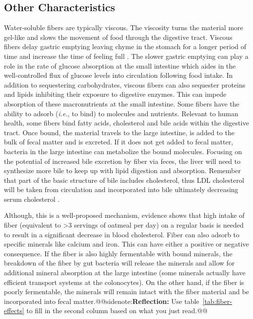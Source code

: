 \documentclass{tufte-handout}
\makeatletter
\def\sidenote#1{@@sidenote:#1@@}
\makeatother
\begin{document}
\subsection{Other Characteristics}
Water-soluble fibers are typically viscous. The viscosity turns the material more gel-like and slows the movement of food through the digestive tract. Viscous fibers delay gastric emptying leaving chyme in the stomach for a longer period of time and increase the time of feeling full \citep{Willis2009}. The slower gastric emptying can play a role in the rate of glucose absorption at the small intestine which aides in the well-controlled flux of glucose levels into circulation following food intake. In addition to sequestering carbohydrates, viscous fibers can also sequester proteins and lipids inhibiting their exposure to digestive enzymes. This can impede absorption of these macronutrients at the small intestine. Some fibers have the ability to adsorb (\textit{i.e.}, to bind) to molecules and nutrients. Relevant to human health, some fibers bind fatty acids, cholesterol and bile acids within the digestive tract. Once bound, the material travels to the large intestine, is added to the bulk of fecal matter and is excreted. If it does not get added to fecal matter, bacteria in the large intestine can metabolize the bound molecules. Focusing on the potential of increased bile excretion by fiber via feces, the liver will need to synthesize more bile to keep up with lipid digestion and absorption. Remember that part of the basic structure of bile includes cholesterol, thus LDL cholesterol will be taken from circulation and incorporated into bile ultimately decreasing serum cholesterol \citep{Brown1999}.

Although, this is a well-proposed mechanism, evidence shows that high intake of fiber (equivalent to >3 servings of oatmeal per day) on a regular basis is needed to result in a significant decrease in blood cholesterol. Fiber can also adsorb to specific minerals like calcium and iron. This can have either a positive or negative consequence. If the fiber is also highly fermentable with bound minerals, the breakdown of the fiber by gut bacteria will release the minerals and allow for additional mineral absorption at the large intestine (some minerals actually have efficient transport systems at the colonocytes). On the other hand, if the fiber is poorly fermentable, the minerals will remain intact with the fiber material and be incorporated into fecal matter.\sidenote{\textbf{Reflection:} Use table~\ref{tab:fiber-effects} to fill in the second column based on what you just read.}  
\end{document}

